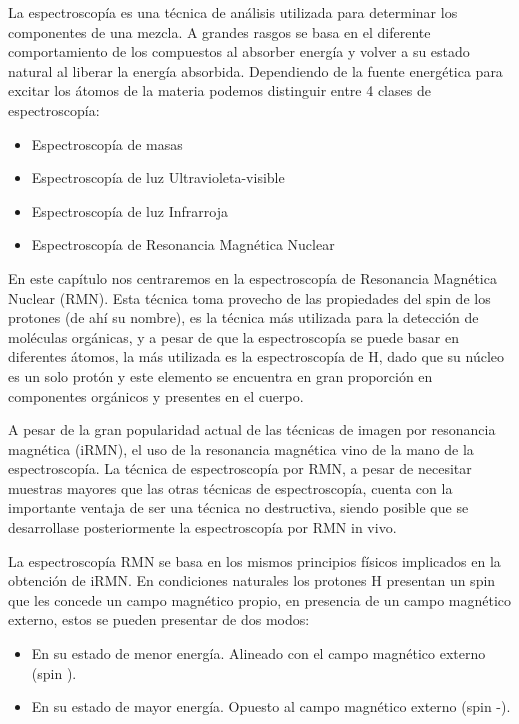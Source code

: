 
La espectroscopía es una técnica de análisis utilizada para determinar los componentes de una mezcla. A grandes rasgos se basa en el diferente comportamiento de los compuestos al absorber energía y volver a su estado natural al liberar la energía absorbida.
Dependiendo de la fuente energética para excitar los átomos de la materia podemos distinguir entre 4 clases de espectroscopía:

\begin{itemize}
 \item Espectroscopía de masas
 \item Espectroscopía de luz Ultravioleta-visible
 \item Espectroscopía de luz Infrarroja
 \item Espectroscopía de Resonancia Magnética Nuclear
\end{itemize}


En este capítulo nos centraremos en la espectroscopía de Resonancia Magnética  Nuclear (RMN). Esta técnica toma provecho de las propiedades del spin de los protones (de ahí su nombre), es la técnica más utilizada para la detección de moléculas orgánicas, y a pesar de que la espectroscopía se puede basar en diferentes átomos, la más utilizada es la espectroscopía de H, dado que su núcleo es un solo protón y este elemento se encuentra en gran proporción en componentes orgánicos y  presentes en el cuerpo.

A pesar de la gran popularidad actual de las técnicas de imagen por resonancia magnética (iRMN),  el uso de la resonancia magnética vino de la mano de la espectroscopía. La técnica de espectroscopía por RMN, a pesar de necesitar muestras mayores que las otras técnicas de espectroscopía, cuenta con la importante ventaja de ser  una técnica no destructiva, siendo posible que se desarrollase posteriormente la espectroscopía por RMN in vivo.

La espectroscopía RMN se basa en los mismos principios físicos implicados en la obtención de iRMN. En condiciones naturales los protones H presentan un spin que les concede un campo magnético propio, en presencia de un campo magnético externo, estos se pueden presentar de dos modos:
\begin{itemize}
 \item En su estado de menor energía. Alineado con el campo magnético externo (spin ).
 \item En su estado de mayor energía. Opuesto al campo magnético externo (spin -).
\end{itemize}



